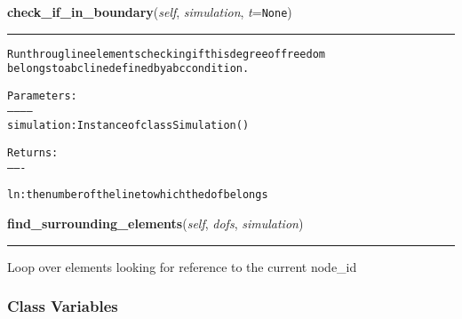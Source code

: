 \hspace{.8\funcindent}\begin{boxedminipage}{\funcwidth}

    \raggedright \textbf{check\_if\_in\_boundary}(\textit{self}, \textit{simulation}, \textit{t}={\tt None})

    \vspace{-1.5ex}

    \rule{\textwidth}{0.5\fboxrule}
\setlength{\parskip}{2ex}
\begin{alltt}

Run throug line elements checking if this degree of freedom 
belongs to a bc line defined by a bc condition.

Parameters:
-----------
simulation:     Instance of class Simulation()

Returns:
-------

ln:     the number of the line to which the dof belongs 
\end{alltt}

\setlength{\parskip}{1ex}
    \end{boxedminipage}

    \label{Classes:DOF:find_surrounding_elements}

    \vspace{0.5ex}

\hspace{.8\funcindent}\begin{boxedminipage}{\funcwidth}

    \raggedright \textbf{find\_surrounding\_elements}(\textit{self}, \textit{dofs}, \textit{simulation})

    \vspace{-1.5ex}

    \rule{\textwidth}{0.5\fboxrule}
\setlength{\parskip}{2ex}
    Loop over elements looking for reference to the current node\_id

\setlength{\parskip}{1ex}
    \end{boxedminipage}



  \subsubsection{Class Variables}

